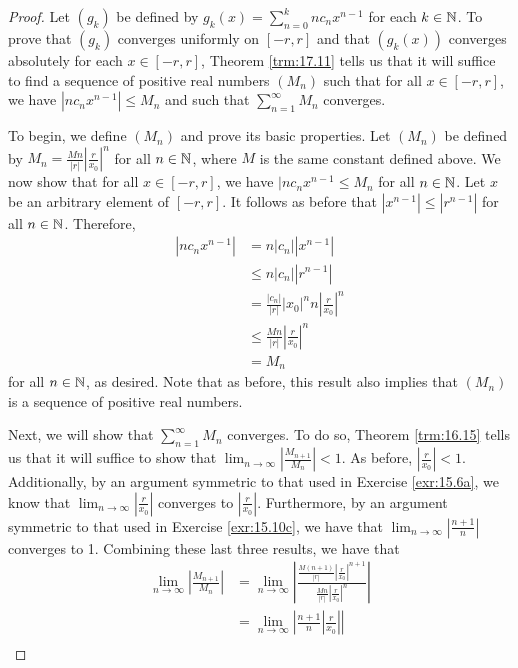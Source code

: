 \documentclass[../main.tex]{subfiles}
\begin{document}
\begin{theorem}
\begin{proof}
        Let $(g_k)$ be defined by $g_k(x)=\sum_{n=0}^knc_nx^{n-1}$ for each $k\in\mathbb{N}$. To prove that $(g_k)$ converges uniformly on $[-r,r]$ and that $(g_k(x))$ converges absolutely for each $x\in[-r,r]$, Theorem \ref{trm:17.11} tells us that it will suffice to find a sequence of positive real numbers $(M_n)$ such that for all $x\in[-r,r]$, we have $|nc_nx^{n-1}|\leq M_n$ and such that $\sum_{n=1}^\infty M_n$ converges.\par\smallskip
        To begin, we define $(M_n)$ and prove its basic properties. Let $(M_n)$ be defined by $M_n=\frac{Mn}{|r|}|\frac{r}{x_0}|^n$ for all $n\in\mathbb{N}$, where $M$ is the same constant defined above. We now show that for all $x\in[-r,r]$, we have $|nc_nx^{n-1}\leq M_n$ for all $n\in\mathbb{N}$. Let $x$ be an arbitrary element of $[-r,r]$. It follows as before that $|x^{n-1}|\leq|r^{n-1}|$ for all $n\in\mathbb{N}$. Therefore,
        \begin{align*}
            |nc_nx^{n-1}| &= n|c_n||x^{n-1}|\\
            &\leq n|c_n||r^{n-1}|\\
            &= \frac{|c_n|}{|r|}|x_0|^nn\left| \frac{r}{x_0} \right|^n\\
            &\leq \frac{Mn}{|r|}\left| \frac{r}{x_0} \right|^n\\
            &= M_n
        \end{align*}
        for all $n\in\mathbb{N}$, as desired. Note that as before, this result also implies that $(M_n)$ is a sequence of positive real numbers.\par
        Next, we will show that $\sum_{n=1}^\infty M_n$ converges. To do so, Theorem \ref{trm:16.15} tells us that it will suffice to show that $\lim_{n\to\infty}|\frac{M_{n+1}}{M_n}|<1$. As before, $|\frac{r}{x_0}|<1$. Additionally, by an argument symmetric to that used in Exercise \ref{exr:15.6a}, we know that $\lim_{n\to\infty}|\frac{r}{x_0}|$ converges to $|\frac{r}{x_0}|$. Furthermore, by an argument symmetric to that used in Exercise \ref{exr:15.10c}, we have that $\lim_{n\to\infty}|\frac{n+1}{n}|$ converges to 1. Combining these last three results, we have that
        \begin{align*}
            \lim_{n\to\infty}\left| \frac{M_{n+1}}{M_n} \right| &= \lim_{n\to\infty}\left| \frac{\frac{M(n+1)}{|r|}\left| \frac{r}{x_0} \right|^{n+1}}{\frac{Mn}{|r|}\left| \frac{r}{x_0} \right|^n} \right|\\
            &= \lim_{n\to\infty}\left| \frac{n+1}{n}\left| \frac{r}{x_0} \right| \right|\\

\end{align*}
\end{proof}
\end{theorem}
\end{document}
